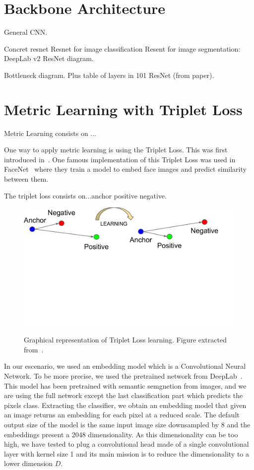 \section{Backbone Architecture}
\label{sec:methods_backbone_architecture}

General CNN.

Concret resnet
Resnet for image classification
Resent for image segmentation: DeepLab v2
ResNet diagram.

Bottleneck diagram. Plus table of layers in 101 ResNet (from paper).


\section{Metric Learning with Triplet Loss}
\label{sec:methods_metriclearning}


Metric Learning consists on ...

One way to apply metric learning is using the Triplet Loss. This was first introduced in~\cite{balntas2016learning}.
One famous implementation of this Triplet Loss was used in FaceNet~\cite{schroff2015facenet} where they train a model to embed face images and predict similarity between them.

The triplet loss consists on...anchor positive negative.

\begin{figure}[h]
  \centering
  \includegraphics[trim=1cm 10cm 2.5cm 0cm, width=0.7\linewidth]{figures/methods/triplet_loss/triplet_viz.pdf}
  \label{fig:triplet_loss_viz}
  \caption{
    Graphical representation of Triplet Loss learning.
    Figure extracted from~\cite{schroff2015facenet}. }
\end{figure}

In our escenario, we used an embedding model which is a Convolutional Neural Network.
To be more precise, we used the pretrained network from DeepLab~\cite{chen2018deeplab}.
This model has been pretrained with semantic semgnetion from images, and we are using the full network except the last classification part which predicts the pixels class.
Extracting the classifier, we obtain an embedding model that given an image returns an embedding for each pixel at a reduced scale.
The default output size of the model is the same input image size downsampled by 8 and the embeddings present a 2048 dimensionality.
As this dimensionality can be too high, we have tested to plug a convolutional head made of a single convolutional layer with kernel size 1 and its main mission is to reduce the dimensionality to a lower dimension $D$.

